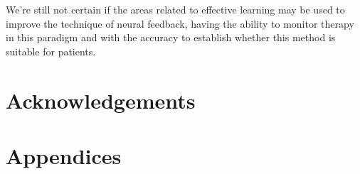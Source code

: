 \documentclass[14pt,a4paper]{scrartcl}
\begin{document}
We’re still not certain if the areas related to effective learning may be used to improve the technique of neural feedback, having the ability to monitor therapy in this paradigm and with the accuracy to establish whether this method is suitable for patients.

\newpage
\section*{Acknowledgements}
\label{sec:Acknowledgements}

\newpage
\section*{Appendices}
\label{sec:Appendices}

\newpage


\end{document}
